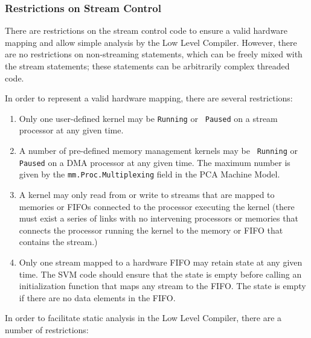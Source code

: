 \subsubsection{Restrictions on Stream Control}

There are restrictions on the stream control code to ensure a valid
hardware mapping and allow simple analysis by the Low Level
Compiler. However, there are no restrictions on non-streaming
statements, which can be freely mixed with the stream statements;
these statements can be arbitrarily complex threaded code.

In order to represent a valid hardware mapping, there are several restrictions:

\renewcommand{\labelenumi}{A\theenumi.}

\begin{enumerate}

\item Only one user-defined kernel may be {\tt Running} or {\tt
Paused} on a stream processor at any given time.

\item A number of pre-defined memory management kernels may be {\tt
Running} or {\tt Paused} on a DMA processor at any given time.  The
maximum number is given by the {\tt mm.Proc.Multiplexing} field in the
PCA Machine Model.

\item A kernel may only read from or write to streams that are mapped
to memories or FIFOs connected to the processor executing the kernel
(there must exist a series of links with no intervening processors or
memories that connects the processor running the kernel to the memory
or FIFO that contains the stream.)

\item Only one stream mapped to a hardware FIFO may retain state at
any given time. The SVM code should ensure that the state is empty
before calling an initialization function that maps any stream to the
FIFO.  The state is empty if there are no data elements in the FIFO.

\end{enumerate}

\noindent In order to facilitate static analysis in the Low Level
Compiler, there are a number of restrictions:

\renewcommand{\labelenumi}{B\theenumi.}


